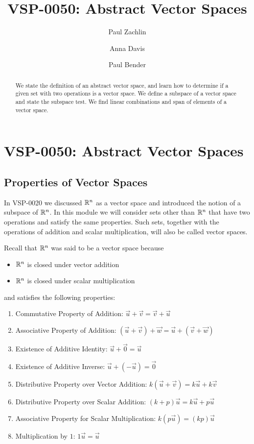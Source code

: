 \documentclass{ximera}
\author{Paul Zachlin \and Anna Davis \and Paul Bender} \title{VSP-0050: Abstract Vector Spaces} \license{CC-BY-NC-SA}
\begin{document}
\begin{abstract}
We state the definition of an abstract vector space, and learn how to determine if a given set with two operations is a vector space. We define a subspace of a vector space and state the subspace test.  We find linear combinations and span of elements of a vector space.
\end{abstract}
\maketitle


\section*{VSP-0050: Abstract Vector Spaces}
\subsection*{Properties of Vector Spaces} 

In VSP-0020 we discussed $\mathbb{R}^n$ as a vector space and introduced the notion of a subspace of $\mathbb{R}^n$.  
In this module we will consider sets other than $\mathbb{R}^n$ that have two operations and satisfy the same properties.  Such sets, together with the operations of addition and scalar multiplication, will also be called vector spaces.

Recall that $\mathbb{R}^n$ was said to be a vector space because
\begin{itemize}
    \item[] $\mathbb{R}^n$ is closed under vector addition
    \item[] $\mathbb{R}^n$ is closed under scalar multiplication
\end{itemize}
and satisfies the following properties:

  \begin{enumerate}
  \item 
  Commutative Property of Addition:\quad
  $\vec{u}+\vec{v}=\vec{v}+\vec{u}$
  \item 
  Associative Property of Addition:\quad
  $(\vec{u}+\vec{v})+\vec{w}=\vec{u}+(\vec{v}+\vec{w})$
  \item 
  Existence of Additive Identity:\quad
  $\vec{u}+\vec{0}=\vec{u}$
  \item 
  Existence of Additive Inverse:\quad
  $\vec{u}+(-\vec{u})=\vec{0}$
  \item
  Distributive Property over Vector Addition:\quad
  $k(\vec{u}+\vec{v})=k\vec{u}+k\vec{v}$
  \item
  Distributive Property over Scalar Addition:\quad
  $(k+p)\vec{u}=k\vec{u}+p\vec{u}$
  \item 
  Associative Property for Scalar Multiplication:\quad
  $k(p\vec{u})=(kp)\vec{u}$
  \item 
  Multiplication by $1$:\quad
  $1\vec{u}=\vec{u}$
  \end{enumerate}
\end{document}
